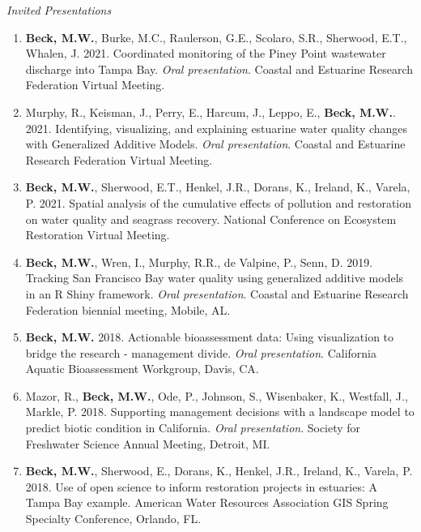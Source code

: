 \documentclass[letterpaper,12pt]{article}
\begin{document}
\vspace{\baselineskip} 
\centerline{\large{\textit{Invited Presentations}}}

\begin{enumerate}

\item {\bf Beck, M.W.}, Burke, M.C., Raulerson, G.E., Scolaro, S.R., Sherwood, E.T., Whalen, J. 2021. Coordinated monitoring of the Piney Point wastewater discharge into Tampa Bay. \textit{Oral presentation}. Coastal and Estuarine Research Federation Virtual Meeting.

\item Murphy, R., Keisman, J., Perry, E., Harcum, J., Leppo, E., {\bf Beck, M.W.}. 2021. Identifying, visualizing, and explaining estuarine water quality changes with Generalized Additive Models. \textit{Oral presentation}. Coastal and Estuarine Research Federation Virtual Meeting.

\item {\bf Beck, M.W.},  Sherwood, E.T., Henkel, J.R., Dorans, K., Ireland, K., Varela, P. 2021. Spatial analysis of the cumulative effects of pollution and restoration on water quality and seagrass recovery.  National Conference on Ecosystem Restoration Virtual Meeting.

\item {\bf Beck, M.W.}, Wren, I., Murphy, R.R., de Valpine, P., Senn, D. 2019. Tracking San Francisco Bay water quality using generalized additive models in an R Shiny framework. \textit{Oral presentation}. Coastal and Estuarine Research Federation biennial meeting, Mobile, AL.

\item {\bf Beck, M.W.} 2018. Actionable bioassessment data: Using visualization to bridge the research - management divide. \textit{Oral presentation}. California Aquatic Bioassessment Workgroup, Davis, CA.

\item Mazor, R., {\bf Beck, M.W.}, Ode, P., Johnson, S., Wisenbaker, K., Westfall, J., Markle, P. 2018. Supporting management decisions with a landscape model to predict biotic condition in California. \textit{Oral presentation}. Society for Freshwater Science Annual Meeting, Detroit, MI.

\item {\bf Beck, M.W.}, Sherwood, E., Dorans, K., Henkel, J.R., Ireland, K., Varela, P. 2018. Use of open science to inform restoration projects in estuaries: A Tampa Bay example. American Water Resources Association GIS Spring Specialty Conference, Orlando, FL. 


\end{enumerate}
\end{document}
